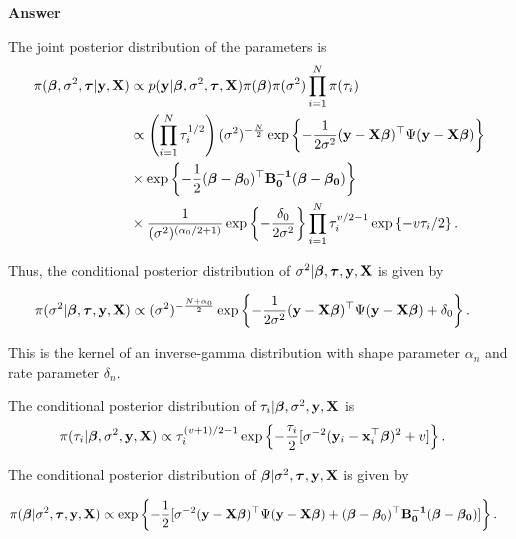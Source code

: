 \begin{enumerate}[leftmargin=*]
\textbf{Answer}

The joint posterior distribution of the parameters is
\begin{align*}
	\pi(\bm{\beta}, \sigma^2, \bm{\tau}|\bf{y}, {\bf{X}}) & \propto p({\bf{y}}|\bm{\beta}, \sigma^2, \bm{\tau}, {\bf{X}}) \pi(\bm{\beta}) \pi(\sigma^2) \prod_{i=1}^N \pi(\tau_i) \\
	&\propto \left(\prod_{i=1}^N \tau_i^{1/2}\right)(\sigma^2)^{-\frac{N}{2}}\exp\left\{-\frac{1}{2\sigma^2}({\bf{y}}-{\bf{X}}\bm{\beta})^{\top}\Psi({\bf{y}}-{\bf{X}}\bm{\beta})\right\}\\
	&\times \exp\left\{-\frac{1}{2}(\bm{\beta} - \bm{\beta}_0)^{\top}\bf{B}_0^{-1}(\bm{\beta} - \bm{\beta}_0)\right\}\\
	&\times\frac{1}{(\sigma^2)^{(\alpha_0/2+1)}}\exp\left\{-\frac{\delta_0}{2\sigma^2}\right\}\prod_{i=1}^N \tau_i^{v/2-1}\exp\left\{-v\tau_i/2\right\}.
\end{align*}

Thus, the conditional posterior distribution of $\sigma^2|\bm{\beta}, \bm{\tau}, \bf{y}, {\bf{X}}$ is given by

\begin{align*}
	\pi(\sigma^2|\bm{\beta}, \bm{\tau}, \bf{y}, {\bf{X}}) & \propto (\sigma^2)^{-\frac{N+\alpha_0}{2}}\exp\left\{-\frac{1}{2\sigma^2}({\bf{y}}-{\bf{X}}\bm{\beta})^{\top}\Psi({\bf{y}}-{\bf{X}}\bm{\beta})+\delta_0\right\}.
\end{align*}

This is the kernel of an inverse-gamma distribution with shape parameter $\alpha_n$ and rate parameter $\delta_n$.

The conditional posterior distribution of $\tau_i|\bm{\beta}, \sigma^2, \bf{y}, {\bf{X}}$ is
\begin{align*}
	\pi(\tau_i|\bm{\beta}, \sigma^2,\bf{y}, {\bf{X}}) & \propto
	\tau_i^{(v+1)/2-1}\exp\left\{-\frac{\tau_i}{2}[\sigma^{-2}({\bf{y}}_i-{\bf{x}}_i^{\top}\bm{\beta})^2+v]\right\}.
\end{align*}

The conditional posterior distribution of $\bm{\beta}|\sigma^2, \bm{\tau}, \bf{y}, {\bf{X}}$ is given by

\begin{align*}
	\pi(\bm{\beta}| \sigma^2, \bm{\tau}, \bf{y}, {\bf{X}}) & \propto \exp\left\{-\frac{1}{2}[\sigma^{-2}({\bf{y}}-{\bf{X}}\bm{\beta})^{\top}\Psi({\bf{y}}-{\bf{X}}\bm{\beta})+(\bm{\beta} - \bm{\beta}_0)^{\top}\bf{B}_0^{-1}(\bm{\beta} - \bm{\beta}_0)]\right\}.
\end{align*} 


\end{enumerate}
